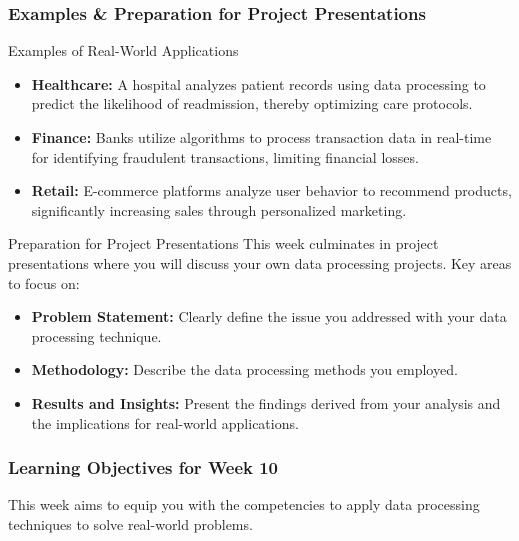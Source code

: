 \documentclass{beamer}
\begin{document}
\begin{frame}[fragile]
    \frametitle{Examples & Preparation for Project Presentations}
    \begin{block}{Examples of Real-World Applications}
        \begin{itemize}
            \item \textbf{Healthcare:} A hospital analyzes patient records using data processing to predict the likelihood of readmission, thereby optimizing care protocols.
            \item \textbf{Finance:} Banks utilize algorithms to process transaction data in real-time for identifying fraudulent transactions, limiting financial losses.
            \item \textbf{Retail:} E-commerce platforms analyze user behavior to recommend products, significantly increasing sales through personalized marketing.
        \end{itemize}
    \end{block}
    
    \begin{block}{Preparation for Project Presentations}
        This week culminates in project presentations where you will discuss your own data processing projects. Key areas to focus on:
        \begin{itemize}
            \item \textbf{Problem Statement:} Clearly define the issue you addressed with your data processing technique.
            \item \textbf{Methodology:} Describe the data processing methods you employed.
            \item \textbf{Results and Insights:} Present the findings derived from your analysis and the implications for real-world applications.
        \end{itemize}
    \end{block}
\end{frame}

\begin{frame}
    \frametitle{Learning Objectives for Week 10}
    This week aims to equip you with the competencies to apply data processing techniques to solve real-world problems.
\end{frame}
\end{document}
